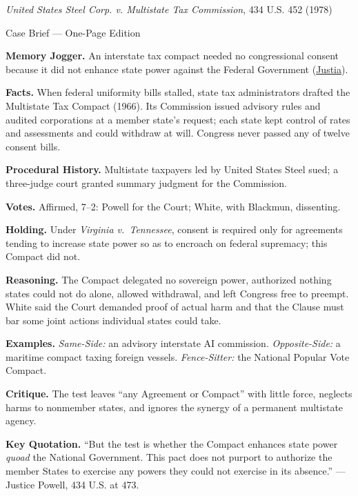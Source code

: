 \documentclass[12pt]{article}
\begin{document}
\begin{center}
{\Large \textit{United States Steel Corp. v. Multistate Tax Commission}, 434 U.S. 452 (1978)\par}
\vspace{0.3em}
{\normalsize Case Brief --- One-Page Edition\par}
\end{center}

\textbf{Memory Jogger.} An interstate tax compact needed no congressional consent because it did not enhance state power against the Federal Government (\href{https://supreme.justia.com/cases/federal/us/434/452/}{Justia}).

\textbf{Facts.} When federal uniformity bills stalled, state tax administrators drafted the Multistate Tax Compact (1966). Its Commission issued advisory rules and audited corporations at a member state's request; each state kept control of rates and assessments and could withdraw at will. Congress never passed any of twelve consent bills.

\textbf{Procedural History.} Multistate taxpayers led by United States Steel sued; a three-judge court granted summary judgment for the Commission.

\textbf{Votes.} Affirmed, 7--2: Powell for the Court; White, with Blackmun, dissenting.

\textbf{Holding.} Under \textit{Virginia v.\ Tennessee}, consent is required only for agreements tending to increase state power so as to encroach on federal supremacy; this Compact did not.

\textbf{Reasoning.} The Compact delegated no sovereign power, authorized nothing states could not do alone, allowed withdrawal, and left Congress free to preempt. White said the Court demanded proof of actual harm and that the Clause must bar some joint actions individual states could take.

\textbf{Examples.} \emph{Same-Side:} an advisory interstate AI commission. \emph{Opposite-Side:} a maritime compact taxing foreign vessels. \emph{Fence-Sitter:} the National Popular Vote Compact.

\textbf{Critique.} The test leaves ``any Agreement or Compact'' with little force, neglects harms to nonmember states, and ignores the synergy of a permanent multistate agency.

\textbf{Key Quotation.} ``But the test is whether the Compact enhances state power \textit{quoad} the National Government. This pact does not purport to authorize the member States to exercise any powers they could not exercise in its absence.'' --- Justice Powell, 434 U.S. at 473.
\end{document}
